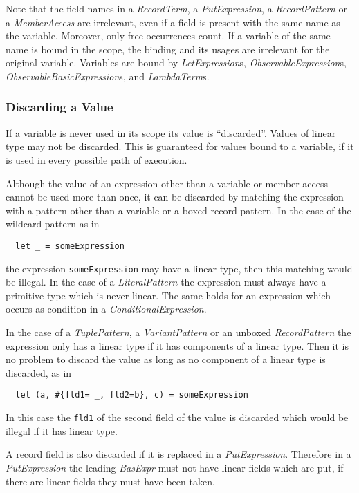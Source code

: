 \documentclass[a4paper]{report}
\newcommand{\code}[1]{\textnormal{\texttt{#1}}}
\begin{document}
Note that the field names in a \textit{RecordTerm}, a \textit{PutExpression}, a \textit{RecordPattern} or a
\textit{MemberAccess} are irrelevant, even if a field is present with the same name as the variable. Moreover,
only free occurrences count. If a variable of the same name is bound in the scope, the binding and its usages
are irrelevant for the original variable. Variables are bound by \textit{LetExpression}s, 
\textit{ObservableExpression}s, \textit{ObservableBasicExpression}s, and \textit{LambdaTerm}s.


\subsubsection{Discarding a Value}


If a variable is never used in its scope its value is ``discarded''. Values of linear type
may not be discarded. This is guaranteed for values bound to a variable, if it is used in every possible path of 
execution. 


Although the value of an expression other than a variable or member access cannot be used more than once, it can be discarded
by matching the expression with a pattern other than a variable or a boxed record pattern. In the case of the wildcard pattern 
as in
\begin{verbatim}
  let _ = someExpression
\end{verbatim}
the expression \code{someExpression} may have a linear type, then this matching would be illegal. In the case of a 
\textit{LiteralPattern} the expression must always have a primitive type which is never linear. The same holds for an expression
which occurs as condition in a \textit{ConditionalExpression}. 

In the case of a 
\textit{TuplePattern}, a \textit{VariantPattern} or an unboxed \textit{RecordPattern} the expression only has a linear
type if it has components of a linear type. Then it is no problem to discard the value as long as no component of a 
linear type is discarded, as in 

\begin{verbatim}
  let (a, #{fld1= _, fld2=b}, c) = someExpression
\end{verbatim}

In this case the \code{fld1} of the second field of the value is discarded which would be illegal if it has linear type.


A record field is also discarded if it is replaced in a \textit{PutExpression}. Therefore in a \textit{PutExpression}
the leading \textit{BasExpr} must not have linear fields which are put, if there are linear fields they must have been taken.
\end{document}
